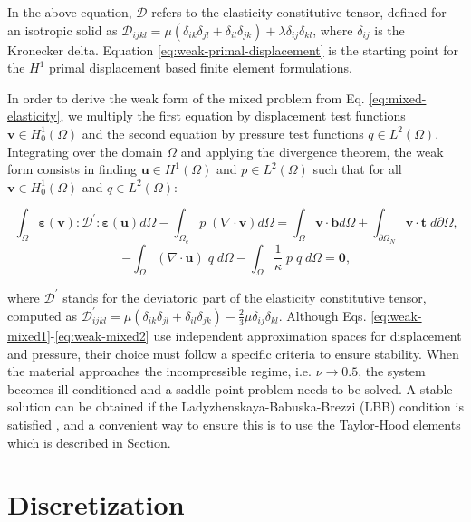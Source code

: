\documentclass[english,11pt,3p,number,sort&compress]{elsarticle}
\begin{document}
In the above equation, $\mathcal{D}$ refers to the elasticity constitutive tensor, defined for an isotropic solid as $\mathcal{D}_{ijkl} = \mu(\delta_{ik}\delta_{jl}+\delta_{il}\delta_{jk})+\lambda\delta_{ij}\delta_{kl}$, where $\delta_{ij}$ is the Kronecker delta. Equation \eqref{eq:weak-primal-displacement} is the starting point for the $H^1$ primal displacement based finite element formulations.

In order to derive the weak form of the mixed problem from Eq. \eqref{eq:mixed-elasticity}, we multiply the first equation by displacement test functions $\mathbf{v} \in H^1_0(\Omega)$ and the second equation by pressure test functions $q \in L^2(\Omega)$. Integrating over the domain $\Omega$ and applying the divergence theorem, the weak form consists in finding $\mathbf{u} \in H^1(\Omega)$ and $p \in L^2(\Omega)$ such that for all $\mathbf{v} \in H^1_0(\Omega)$ and $q \in L^2(\Omega)$:

\begin{equation} \label{eq:weak-mixed1}
	\int_{\Omega} \boldsymbol{\varepsilon}(\mathbf{v}) : \mathcal{D}^{'} : \boldsymbol{\varepsilon}(\mathbf{u}) d\Omega - \int_{\Omega_e} p \;(\nabla \cdot \mathbf{v}) d\Omega =  \int_{\Omega} \mathbf{v} \cdot \mathbf{b} d\Omega + \int_{\partial\Omega_N} \mathbf{v} \cdot \mathbf{t} \;d\partial\Omega \text{,}
\end{equation}
\begin{equation} \label{eq:weak-mixed2}
-\int_{\Omega} (\nabla \cdot \mathbf{u}) \;q\; d\Omega -\int_{\Omega} \frac{1}{\kappa}\;p \;q\; d\Omega = \mathbf{0} \text{,}
\end{equation}

\noindent where $\mathcal{D}^{'}$ stands for the deviatoric part of the elasticity constitutive tensor, computed as $\mathcal{D}^{'}_{ijkl} = \mu(\delta_{ik}\delta_{jl}+\delta_{il}\delta_{jk})-\frac{2}{3}\mu\delta_{ij}\delta_{kl}$. Although Eqs. \eqref{eq:weak-mixed1}-\eqref{eq:weak-mixed2} use independent approximation spaces for displacement and pressure, their choice must follow a specific criteria to ensure stability. When the material approaches the incompressible regime, i.e. $\nu \rightarrow 0.5$, the system becomes ill conditioned and a saddle-point problem needs to be solved. A stable solution can be obtained if the Ladyzhenskaya-Babuska-Brezzi (LBB) condition is satisfied \cite{brezzi2012mixed}, and a convenient way to ensure this is to use the Taylor-Hood elements \cite{taylor1973numerical} which is described in Section.
\section{Discretization \label{sec:Discretization}}
\end{document}
